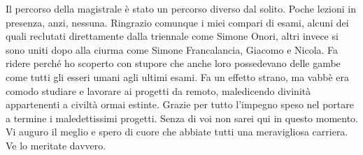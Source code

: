 {Il percorso della magistrale è stato un percorso diverso dal solito. Poche lezioni in presenza, anzi, nessuna. Ringrazio comunque i miei compari di esami, alcuni dei quali reclutati direttamente dalla triennale come Simone Onori, altri invece si sono uniti dopo alla ciurma come Simone Francalancia, Giacomo e Nicola. Fa ridere perché ho scoperto con stupore che anche loro possedevano delle gambe come tutti gli esseri umani agli ultimi esami. Fa un effetto strano, ma vabbè era comodo studiare e lavorare ai progetti da remoto, maledicendo divinità appartenenti a civiltà ormai estinte. Grazie per tutto l'impegno speso nel portare a termine i maledettissimi progetti. Senza di voi non sarei qui in questo momento. Vi auguro il meglio e spero di cuore che abbiate tutti una meravigliosa carriera. Ve lo meritate davvero.





}
